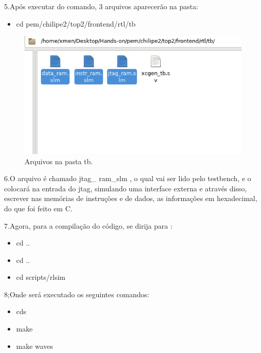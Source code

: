 \par 5.Após executar do comando, 3 arquivos aparecerão na pasta:

\begin{itemize}
  \item cd pem/chilipe2/top2/frontend/rtl/tb
\end{itemize}

\begin{figure}[H]
  \includegraphics[width=\linewidth]{diagrams/pastatb.png}
  \caption{Arquivos na pasta tb.}
  \label{fig:top}
\end{figure}

\par 6.O arquivo é chamado jtag\_ ram\_slm , o qual vai ser lido pelo testbench, e o colocará na entrada do jtag, simulando uma interface externa e através disso, escrever nas memórias de instruções e de dados, as informações em hexadecimal, do que foi feito em C.
\\
\par 7.Agora, para a compilação do código, se dirija para :

\begin{itemize}
  \item cd ..
  \item cd ..
  \item cd scripts/rlsim
\end{itemize}

\par 8;Onde será executado os seguintes comandos:

\begin{itemize}
  \item cds
  \item make
  \item make waves
\end{itemize}

